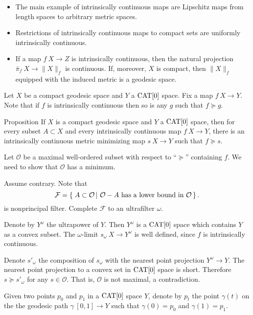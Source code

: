 \documentclass{article}
\begin{document}
\begin{itemize}
 \item The main example of intrinsically continuous maps are Lipschitz
maps from length spaces to arbitrary metric spaces.
\item Restrictions of intrinsically continuous maps to compact sets are uniformly intrinsically continuous. %
\item If a map $f\:X\to Z$ is intrinsically continuous, then 
the natural projection $\bar\pi_f\:X\rightarrow \|X\|_f$ is continuous. 
If, moreover, $X$ is compact, then $\|X\|_f$ equipped with the induced 
metric is a geodesic space.
\end{itemize}


Let $X$ be a compact geodesic space and $Y$ a $\mathop{\rm CAT}\nolimits[0]$ space. 
Fix a map $f\:X\to Y$.
Note that if $f$ is intrinsically continuous then so is any $g$ such that $f\succcurlyeq g$.

\begin{thm}{Proposition}\label{prop:exist}
If $X$ is a compact geodesic space and $Y$ a $\mathop{\rm CAT}\nolimits[0]$ space, then for every subset $A\subset X$ and every intrinsically continuous map $f\:X\rightarrow Y$,
there is an intrinsically continuous  metric minimizing map $s\:X\rightarrow Y$
such that $f\succcurlyeq s$.
\end{thm}

Let $\mathcal{O}$ be a maximal well-ordered subset with respect to ``$\succcurlyeq$'' containing $f$. 
We need to show that $\mathcal{O}$ has a minimum.

Assume contrary.
Note that
$$
\mathcal{F}
=
\set{A\subset\mathcal{O}}{\mathcal{O}-A\text{ has a lower bound in }\mathcal{O}}.
$$
is nonprincipal filter.
Complete $\mathcal{F}$ to an ultrafilter $\omega$. 

Denote by $Y^\omega$ the ultrapower of $Y$. 
Then $Y^\omega$
is a $\mathop{\rm CAT}\nolimits[0]$ space which contains $Y$ as a convex subset. 
The $\omega$-limit $s_\omega\:X\to Y^\omega$ is well defined, since
$f$ is intrinsically continuous. 

Denote $s'_\omega$ the composition of $s_\omega$ with the nearest point projection $Y^\omega\to Y$.
The nearest point projection to a convex set in $\mathop{\rm CAT}\nolimits[0]$ space is short.
Therefore $s\succcurlyeq s'_\omega$ for any $s\in \mathcal{O}$.
That is, $\mathcal{O}$ is not maximal, a contradiction.
\qeds

Given two points $p_0$ and $p_1$ in a $\mathop{\rm CAT}\nolimits[0]$ space $Y$,
denote by $p_t$ the point $\gamma(t)$ on the 
the geodesic path $\gamma\:[0,1]\to Y$ such that $\gamma(0)=p_0$ and $\gamma(1)=p_1$.
\end{document}
